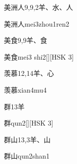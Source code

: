 \begin{entry}{美洲人}{9,9,2}{⽺、⽔、⼈}
  \begin{phonetics}{美洲人}{mei3zhou1ren2}
  \end{phonetics}
\end{entry}

\begin{entry}{美食}{9,9}{⽺、⾷}
  \begin{phonetics}{美食}{mei3 shi2}[][HSK 3]
  \end{phonetics}
\end{entry}

\begin{entry}{羡慕}{12,14}{⽺、⼼}
  \begin{phonetics}{羡慕}{xian4mu4}
  \end{phonetics}
\end{entry}

\begin{entry}{群}{13}{⽺}
  \begin{phonetics}{群}{qun2}[][HSK 3]
  \end{phonetics}
\end{entry}

\begin{entry}{群山}{13,3}{⽺、⼭}
  \begin{phonetics}{群山}{qun2shan1}
  \end{phonetics}
\end{entry}


